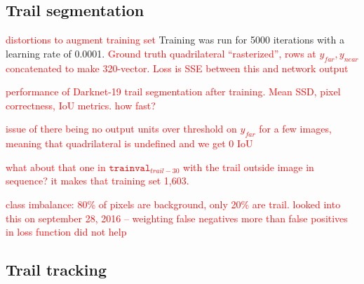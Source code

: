 \documentclass[letterpaper, 10 pt, conference]{ieeeconf}  %
\newcommand{\comment}[1]{\textcolor{red}{#1}}
\newcommand{\TrailAnnotatedSet}{\mathtt{trainval}_{trail}}
\newcommand{\TrailSeqAnnotatedSet}{\mathtt{trainval}_{trail-30}}
\newcommand{\TrailNearLine}{y_{near}}
\newcommand{\TrailFarLine}{y_{far}}
\begin{document}


\subsection{Trail segmentation}



\comment{distortions to augment training set} Training was run for 5000 iterations with a learning rate of 0.0001. \comment{Ground truth quadrilateral ``rasterized'', rows at $\TrailFarLine, \TrailNearLine$ concatenated to make 320-vector.  Loss is SSE between this and network output}

\comment{performance of Darknet-19 trail segmentation after training.
  Mean SSD, pixel correctness, IoU metrics.  how fast?}

\comment{issue of there being no output units over threshold on $\TrailFarLine$ for a few images, meaning
  that quadrilateral is undefined and we get 0 IoU}

\comment{what about that one in $\TrailSeqAnnotatedSet$ with the trail outside image in sequence?  it makes that training set 1,603.}

\comment{class imbalance: 80\% of pixels are background, only 20\% are trail.  looked into this on september 28, 2016 -- weighting false negatives more than false positives in loss function did not help}



\subsection{Trail tracking}

\end{document}
